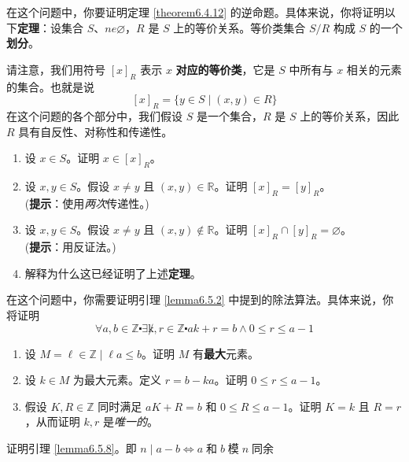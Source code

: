 \begin{exercise}\label{exc:exercises6.7.13}
    在这个问题中，你要证明定理 \ref{theorem6.4.12} 的逆命题。具体来说，你将证明以下\textbf{定理}：设集合 $S 、ne \varnothing$，$R$ 是 $S$ 上的等价关系。等价类集合 $S/R$ 构成 $S$ 的一个\textbf{划分}。

    请注意，我们用符号 $[x]_R$ 表示 $x$ \textbf{对应的等价类}，它是 $S$ 中所有与 $x$ 相关的元素的集合。也就是说
    \[[x]_R = \{y \in S \mid (x, y) \in R\}\]
    在这个问题的各个部分中，我们假设 $S$ 是一个集合，$R$ 是 $S$ 上的等价关系，因此 $R$ 具有自反性、对称性和传递性。
    \begin{enumerate}[label=(\alph*)]
        \item 设 $x \in S$。证明 $x \in [x]_R$。
        \item 设 $x, y \in S$。假设 $x \ne y$ 且 $(x, y) \in \mathbb{R}$。证明 $[x]_R = [y]_R$。\\
            (\textbf{提示}：使用\emph{两次}传递性。)
        \item 设 $x, y \in S$。假设 $x \ne y$ 且 $(x, y) \notin \mathbb{R}$。证明 $[x]_R \cap [y]_R = \varnothing$。\\
            (\textbf{提示}：用反证法。)
        \item 解释为什么这已经证明了上述\textbf{定理}。
    \end{enumerate}
\end{exercise}

\begin{exercise}\label{exc:exercises6.7.14}
    在这个问题中，你需要证明引理 \ref{lemma6.5.2} 中提到的除法算法。具体来说，你将证明
    \[\forall a, b \in \mathbb{Z} \centerdot \exists \not k, r \in \mathbb{Z} \centerdot ak + r = b \land 0 \le r \le a-1\]
    \begin{enumerate}
        \item 设 $M = {\ell \in \mathbb{Z} \mid \ell a \le b}$。证明 $M$ 有\textbf{最大}元素。
        \item 设 $k \in M$ 为最大元素。定义 $r = b-ka$。证明 $0 \le r \le a-1$。
        \item 假设 $K,R \in \mathbb{Z}$ 同时满足 $aK + R = b$ 和 $ 0 \le R \le a-1$。证明 $K=k$ 且 $R=r$，从而证明 $k,r$ 是\emph{唯一的}。
    \end{enumerate}
\end{exercise}

\begin{exercise}\label{exc:exercises6.7.15}
    证明引理 \ref{lemma6.5.8}。即 $n \mid a - b \iff a \;\text{和}\; b \;\text{模}\; n \;\text{同余}$
\end{exercise}

